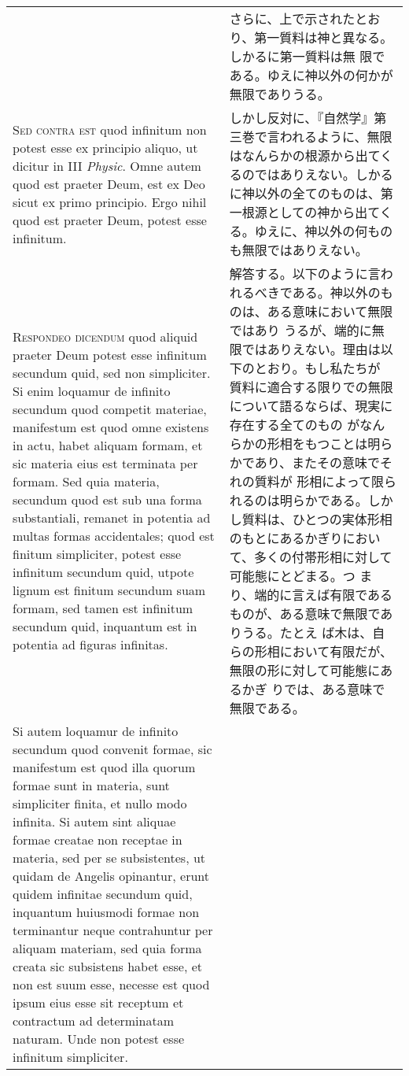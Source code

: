 \documentclass[10pt]{jsarticle} %
\begin{document}
\begin{longtable}{p{21em}p{21em}}
&

さらに、上で示されたとおり、第一質料は神と異なる。しかるに第一質料は無
 限である。ゆえに神以外の何かが無限でありうる。


\\

{\scshape Sed contra est} quod infinitum non potest esse ex principio aliquo, ut
dicitur in III {\itshape Physic}. Omne autem quod est praeter Deum, est ex Deo
sicut ex primo principio. Ergo nihil quod est praeter Deum, potest esse
infinitum.

&

しかし反対に、『自然学』第三巻で言われるように、無限はなんらかの根源から出てくるのではありえない。しかるに神以外の全てのものは、第一根源としての神から出てくる。ゆえに、神以外の何ものも無限ではありえない。


\\


{\scshape Respondeo dicendum} quod aliquid praeter Deum potest esse infinitum
secundum quid, sed non simpliciter. Si enim loquamur de infinito
secundum quod competit materiae, manifestum est quod omne existens in
actu, habet aliquam formam, et sic materia eius est terminata per
formam. Sed quia materia, secundum quod est sub una forma substantiali,
remanet in potentia ad multas formas accidentales; quod est finitum
simpliciter, potest esse infinitum secundum quid, utpote lignum est
finitum secundum suam formam, sed tamen est infinitum secundum quid,
inquantum est in potentia ad figuras infinitas.

&

解答する。以下のように言われるべきである。神以外のものは、ある意味において無限ではあり
 うるが、端的に無限ではありえない。理由は以下のとおり。もし私たちが
 質料に適合する限りでの無限について語るならば、現実に存在する全てのもの
 がなんらかの形相をもつことは明らかであり、またその意味でそれの質料が
 形相によって限られるのは明らかである。しかし質料は、ひとつの実体形相
 のもとにあるかぎりにおいて、多くの付帯形相に対して可能態にとどまる。つ
 まり、端的に言えば有限であるものが、ある意味で無限でありうる。たとえ
 ば木は、自らの形相において有限だが、無限の形に対して可能態にあるかぎ
 りでは、ある意味で無限である。



\\

Si autem loquamur de infinito secundum quod convenit formae, sic
manifestum est quod illa quorum formae sunt in materia, sunt simpliciter
finita, et nullo modo infinita. Si autem sint aliquae formae creatae non
receptae in materia, sed per se subsistentes, ut quidam de Angelis
opinantur, erunt quidem infinitae secundum quid, inquantum huiusmodi
formae non terminantur neque contrahuntur per aliquam materiam, sed quia
forma creata sic subsistens habet esse, et non est suum esse, necesse
est quod ipsum eius esse sit receptum et contractum ad determinatam
naturam. Unde non potest esse infinitum simpliciter.


\end{longtable}
\end{document}
